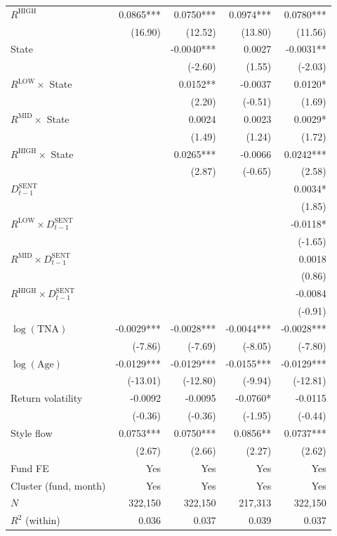 \begin{table}[!htbp]
{\begin{tabular*}{\linewidth}{@{\extracolsep{\fill}}lrrrr}
$R^{\text{HIGH}}$ & 0.0865*** & 0.0750*** & 0.0974*** & 0.0780***\\
 & (16.90) & (12.52) & (13.80) & (11.56)\\
State &  & -0.0040*** & 0.0027 & -0.0031**\\
 &  & (-2.60) & (1.55) & (-2.03)\\
$R^{\text{LOW}}\times$ State &  & 0.0152** & -0.0037 & 0.0120*\\
 &  & (2.20) & (-0.51) & (1.69)\\
$R^{\text{MID}}\times$ State &  & 0.0024 & 0.0023 & 0.0029*\\
 &  & (1.49) & (1.24) & (1.72)\\
$R^{\text{HIGH}}\times$ State &  & 0.0265*** & -0.0066 & 0.0242***\\
 &  & (2.87) & (-0.65) & (2.58)\\
$D^{\text{SENT}}_{t-1}$ &  &  &  & 0.0034*\\
 &  &  &  & (1.85)\\
$R^{\text{LOW}}\times D^{\text{SENT}}_{t-1}$ &  &  &  & -0.0118*\\
 &  &  &  & (-1.65)\\
$R^{\text{MID}}\times D^{\text{SENT}}_{t-1}$ &  &  &  & 0.0018\\
 &  &  &  & (0.86)\\
$R^{\text{HIGH}}\times D^{\text{SENT}}_{t-1}$ &  &  &  & -0.0084\\
 &  &  &  & (-0.91)\\
$\log(\text{TNA})$ & -0.0029*** & -0.0028*** & -0.0044*** & -0.0028***\\
 & (-7.86) & (-7.69) & (-8.05) & (-7.80)\\
$\log(\text{Age})$ & -0.0129*** & -0.0129*** & -0.0155*** & -0.0129***\\
 & (-13.01) & (-12.80) & (-9.94) & (-12.81)\\
Return volatility & -0.0092 & -0.0095 & -0.0760* & -0.0115\\
 & (-0.36) & (-0.36) & (-1.95) & (-0.44)\\
Style flow & 0.0753*** & 0.0750*** & 0.0856** & 0.0737***\\
 & (2.67) & (2.66) & (2.27) & (2.62)\\
\midrule
Fund FE & Yes & Yes & Yes & Yes\\
Cluster (fund, month) & Yes & Yes & Yes & Yes\\
$N$ & 322,150 & 322,150 & 217,313 & 322,150\\
$R^2$ (within) & 0.036 & 0.037 & 0.039 & 0.037\\

\end{tabular*}}
\end{table}
